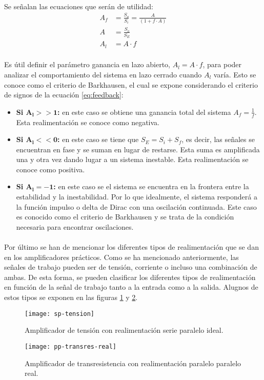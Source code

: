 \paragraph{}
Se señalan las ecuaciones que ser\'an de utilidad:
\begin{align}
   \label{eq:feedback}
   A_f &= \frac{S_o}{S_i} = \frac{A}{(1 + f \cdot A)} \\
   \label{eq:A}
   A &= \frac{S_o}{S_E} \\
   \label{eq:Al}
   A_l &= A \cdot f
\end{align}
\paragraph{}
Es útil definir el par\'ametro ganancia en lazo abierto, $A_l = A \cdot f$, para poder analizar el comportamiento del sistema en lazo cerrado cuando $A_l$ var\'ia. Esto se conoce como el criterio de Barkhausen, el cual se expone considerando el criterio de signos de la ecuaci\'on \ref{eq:feedback}:
\begin{itemize}
   \item \textbf{Si $\mathbf {A_l >> 1}$:} en este caso se obtiene una ganancia total del sistema $A_f = \frac{1}{f}$. Esta realimentación se conoce como negativa.
   \item \textbf{Si $\mathbf{A_l << 0}$:} en este caso se tiene que $S_E = S_i + S_f$, es decir, las señales se encuentran en fase y se suman en lugar de restarse. Esta suma es amplificada una y otra vez dando lugar a un sistema inestable. Esta realimentación se conoce como positiva.
   \item \textbf{Si $\mathbf{A_l = -1}$:} en este caso se el sistema se encuentra en la frontera entre la estabilidad y la inestabilidad. Por lo que idealmente, el sistema responder\'a a la funci\'on impulso o delta de Dirac con una oscilaci\'on continuada. Este caso es conocido como el criterio de Barkhausen y se trata de la condici\'on necesaria para encontrar oscilaciones.
\end{itemize}
\paragraph{}
Por último se han de mencionar los diferentes tipos de realimentación que se dan en los amplificadores prácticos. Como se ha mencionado anteriormente, las señales de trabajo pueden ser de tensión, corriente o incluso una combinación de ambas. De esta forma, se pueden clasificar los diferentes tipos de realimentación en función de la señal de trabajo tanto a la entrada como a la salida. Alugnos de estos tipos se exponen en las figuras \ref{fig:sp} y \ref{fig:pp}.
\begin{figure}[H]
    \centering
    \texttt{[image: sp-tension]}
    \caption{Amplificador de tensión con realimentaci\'on serie paralelo ideal.} 
    \label{fig:sp}
\end{figure}

\begin{figure}[H]
    \centering
    \texttt{[image: pp-transres-real]}
    \caption{Amplificador de transresistencia con realimentación paralelo paralelo real.} 
    \label{fig:pp}
\end{figure}
